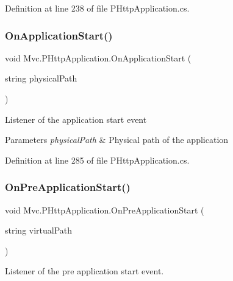 Definition at line 238 of file P\+Http\+Application.\+cs.

\mbox{\label{class_mvc_1_1_p_http_application_a38a4aec623c570fbd05c9e4c33951a05}} 
\subsubsection{\texorpdfstring{On\+Application\+Start()}{OnApplicationStart()}}
{\footnotesize\ttfamily void Mvc.\+P\+Http\+Application.\+On\+Application\+Start (\begin{DoxyParamCaption}\item[{string}]{physical\+Path }\end{DoxyParamCaption})}



Listener of the application start event 


\begin{DoxyParams}{Parameters}
{\em physical\+Path} & Physical path of the application\\
\hline
\end{DoxyParams}


Definition at line 285 of file P\+Http\+Application.\+cs.

\mbox{\label{class_mvc_1_1_p_http_application_af4ab5d8d6f1db0a740617bd686fd0e4a}} 
\subsubsection{\texorpdfstring{On\+Pre\+Application\+Start()}{OnPreApplicationStart()}}
{\footnotesize\ttfamily void Mvc.\+P\+Http\+Application.\+On\+Pre\+Application\+Start (\begin{DoxyParamCaption}\item[{string}]{virtual\+Path }\end{DoxyParamCaption})}



Listener of the pre application start event. 


